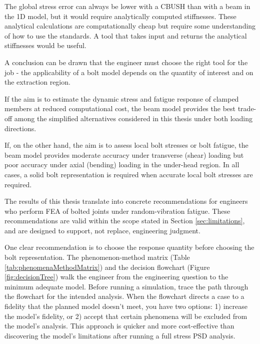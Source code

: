 \documentclass[a4paper,twoside]{bth}
\begin{document}
The global stress error can always be lower with a CBUSH than with a beam in the 1D model, but it would require analytically computed stiffnesses. These analytical calculations are computationally cheap but require some understanding of how to use the standards. A tool that takes input and returns the analytical stiffnesses would be useful.

A conclusion can be drawn that the engineer must choose the right tool for the job - the applicability of a bolt model depends on the quantity of interest and on the extraction region.

If the aim is to estimate the dynamic stress and fatigue response of clamped members at reduced computational cost, the beam model provides the best trade-off among the simplified alternatives considered in this thesis under both loading directions.

If, on the other hand, the aim is to assess local bolt stresses or bolt fatigue, the beam model provides moderate accuracy under transverse (shear) loading but poor accuracy under axial (bending) loading in the under-head region. In all cases, a solid bolt representation is required when accurate local bolt stresses are required.

The results of this thesis translate into concrete recommendations for engineers who perform \ac{FEA} of bolted joints under random-vibration fatigue. These recommendations are valid within the scope stated in Section \ref{sec:limitations}, and are designed to support, not replace, engineering judgment.

One clear recommendation is to choose the response quantity before choosing the bolt representation. The phenomenon-method matrix (Table \ref{tab:phenomenaMethodMatrix}) and the decision flowchart (Figure \ref{fig:decisionTree}) walk the engineer from the engineering question to the minimum adequate model. Before running a simulation, trace the path through the flowchart for the intended analysis. When the flowchart directs a case to a fidelity that the planned model doesn't meet, you have two options: 1) increase the model's fidelity, or 2) accept that certain phenomena will be excluded from the model's analysis. This approach is quicker and more cost-effective than discovering the model's limitations after running a full stress \ac{PSD} analysis.
\end{document}
